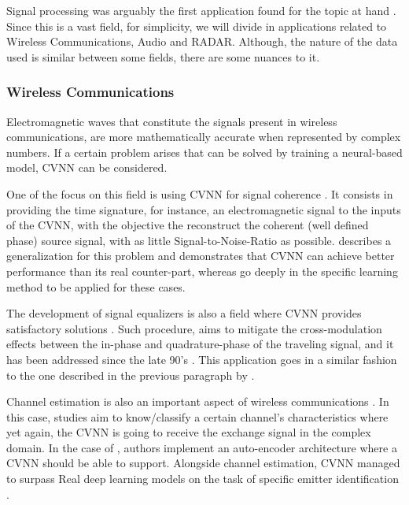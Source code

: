 Signal processing was arguably the first application found for the topic at hand \parencite{bassey2021survey, hirose2012complex}. Since this is a vast field, for simplicity, we will divide in applications related to Wireless Communications, Audio and RADAR. Although, the nature of the data used is similar between some fields, there are some nuances to it.

\subsubsection{Wireless Communications}
Electromagnetic waves that constitute the signals present in wireless communications, are more mathematically accurate when represented by complex numbers. If a certain problem arises that can be solved by training a neural-based model, \gls{CVNN} can be considered. 

One of the focus on this field is using \gls{CVNN} for signal coherence \parencite{hirose2012cohersignal, wu2017singalcohercvnn}. It consists in providing the time signature, for instance, an electromagnetic signal to the inputs of the \gls{CVNN}, with the objective the reconstruct the coherent (well defined phase) source signal, with as little Signal-to-Noise-Ratio as possible. \textcite{hirose2012cohersignal} describes a generalization for this problem and demonstrates that \gls{CVNN} can achieve better performance than its real counter-part, whereas \textcite{wu2017singalcohercvnn} go deeply in the specific learning method to be applied for these cases.

The development of signal equalizers is also a field where \gls{CVNN} provides satisfactory solutions \parencite{uncini1999equalizerold, cheolwoo1998oldeuqalizer, hong2014equalizerhammer, liu2017equalizercvnn}. Such procedure, aims to mitigate the cross-modulation effects between the in-phase and quadrature-phase of the traveling signal, and it has been addressed since the late 90's \parencite{uncini1999equalizerold, cheolwoo1998oldeuqalizer}. This application goes in a similar fashion to the one described in the previous paragraph by \textcite{liu2017equalizercvnn}. 

Channel estimation is also an important aspect of wireless communications \parencite{murata2015cvnnforsignalchapter, yuan2019channel}. In this case, studies aim to know/classify a certain channel's characteristics where yet again, the \gls{CVNN} is going to receive the exchange signal in the complex domain. In the case of \parencite{yuan2019channel}, authors implement an auto-encoder architecture where a \gls{CVNN} should be able to support. Alongside channel estimation, \gls{CVNN} managed to surpass Real deep learning models on the task of specific emitter identification \parencite{wang2021emmiteridcvnn}.

